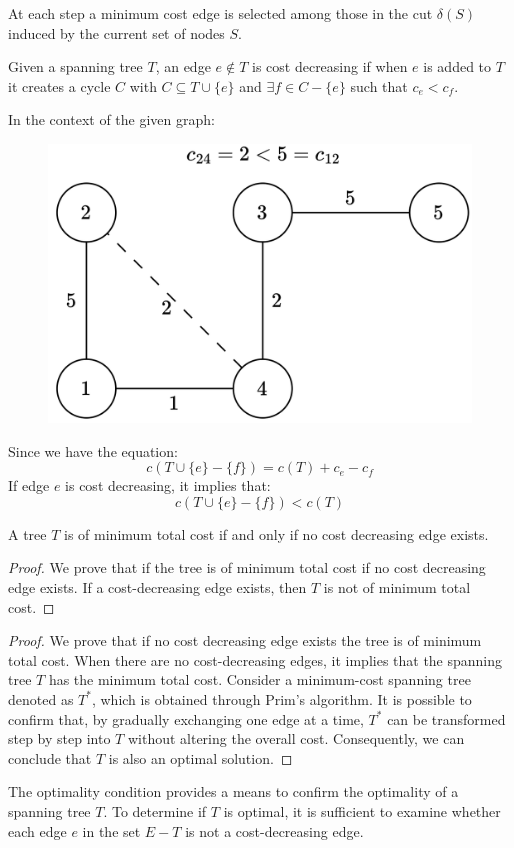 At each step a minimum cost edge is selected among those in the cut $\delta (S)$ induced by the current set of nodes $S$. 
\begin{definition}
    Given a spanning tree $T$, an edge $e \notin T$ is cost decreasing if when $e$ is added to $T$ it creates a cycle $C$ with $C \subseteq T \cup \{e\}$ and $\exists f \in C-\{e\}$ such that $c_e<c_f$. 
\end{definition}
\begin{example}
    In the context of the given graph:
    \begin{figure}[H]
        \centering
        \includegraphics[width=0.4\linewidth]{images/costdecreasing.png}
    \end{figure}
    Since we have the equation:
    \[c(T \cup \{e\}-\{f\})=c(T)+c_e-c_f\]
    If edge $e$ is cost decreasing, it implies that:
    \[c(T \cup \{e\}-\{f\})<c(T)\]
\end{example}
\begin{theorem}
    A tree $T$ is of minimum total cost if and only if no cost decreasing edge exists. 
\end{theorem}

\begin{proof}
    We prove that if the tree is of minimum total cost if no cost decreasing edge exists.
    If a cost-decreasing edge exists, then $T$ is not of minimum total cost.
\end{proof}
\begin{proof}
    We prove that if no cost decreasing edge exists the tree is of minimum total cost.
    When there are no cost-decreasing edges, it implies that the spanning tree $T$ has the minimum total cost.
    Consider a minimum-cost spanning tree denoted as $T^{\ast}$, which is obtained through Prim's algorithm.
    It is possible to confirm that, by gradually exchanging one edge at a time, $T^{\ast}$ can be transformed step by step into $T$ without altering the overall cost.
    Consequently, we can conclude that $T$ is also an optimal solution.
\end{proof}
The optimality condition provides a means to confirm the optimality of a spanning tree $T$. 
To determine if $T$ is optimal, it is sufficient to examine whether each edge $e$ in the set $E-T$ is not a cost-decreasing edge.